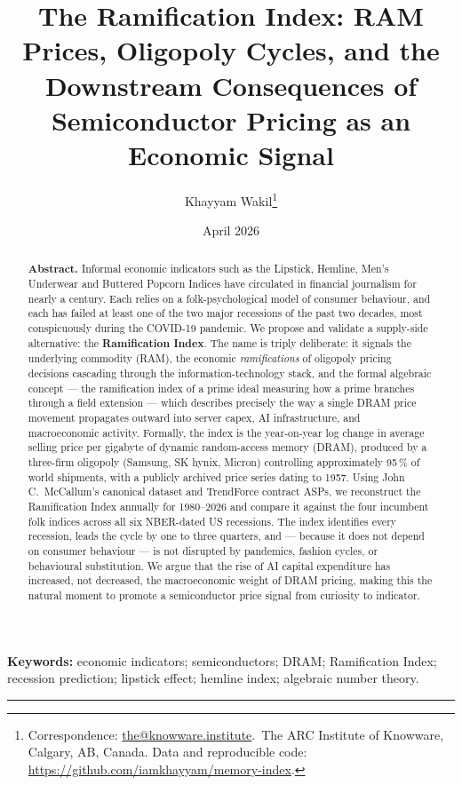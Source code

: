 \documentclass[11pt,a4paper]{article}
\title{\textbf{The Ramification Index: RAM Prices, Oligopoly Cycles, and the Downstream Consequences of Semiconductor Pricing as an Economic Signal}}
\author{%
  Khayyam Wakil\thanks{Correspondence: \href{mailto:the@knowware.institute}{the@knowware.institute}.\ The ARC Institute of Knowware, Calgary, AB, Canada. Data and reproducible code: \url{https://github.com/iamkhayyam/memory-index}.}%
}
\date{April 2026}
\begin{document}
\maketitle

\begin{abstract}
\noindent\textbf{Abstract.} Informal economic indicators such as the Lipstick, Hemline, Men's Underwear and Buttered Popcorn Indices have circulated in financial journalism for nearly a century. Each relies on a folk-psychological model of consumer behaviour, and each has failed at least one of the two major recessions of the past two decades, most conspicuously during the COVID-19 pandemic. We propose and validate a supply-side alternative: the \textbf{Ramification Index}. The name is triply deliberate: it signals the underlying commodity (RAM), the economic \emph{ramifications} of oligopoly pricing decisions cascading through the information-technology stack, and the formal algebraic concept --- the ramification index of a prime ideal measuring how a prime branches through a field extension \citep{neukirch1999} --- which describes precisely the way a single DRAM price movement propagates outward into server capex, AI infrastructure, and macroeconomic activity. Formally, the index is the year-on-year log change in average selling price per gigabyte of dynamic random-access memory (DRAM), produced by a three-firm oligopoly (Samsung, SK hynix, Micron) controlling approximately 95\,\% of world shipments, with a publicly archived price series dating to 1957. Using John C.~McCallum's canonical dataset and TrendForce contract ASPs, we reconstruct the Ramification Index annually for 1980--2026 and compare it against the four incumbent folk indices across all six NBER-dated US recessions. The index identifies every recession, leads the cycle by one to three quarters, and --- because it does not depend on consumer behaviour --- is not disrupted by pandemics, fashion cycles, or behavioural substitution. We argue that the rise of AI capital expenditure has increased, not decreased, the macroeconomic weight of DRAM pricing, making this the natural moment to promote a semiconductor price signal from curiosity to indicator.
\end{abstract}

\vspace{0.5em}
\noindent\textbf{Keywords:} economic indicators; semiconductors; DRAM; Ramification Index; recession prediction; lipstick effect; hemline index; algebraic number theory.

\noindent\rule{\textwidth}{0.4pt}
\end{document}
